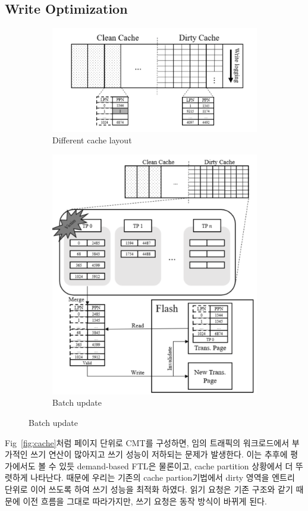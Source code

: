 \documentclass[conference]{IEEEtran}
\begin{document}
\subsection{Write Optimization}
\begin{figure}[hbt]
	\centering
	\begin{subfigure}[b]{0.5\textwidth}	
		\includegraphics[width=\linewidth]{image/PTSD/Dcache.png}
		\caption{Different cache layout} \label{fig:Dcache}
	\end{subfigure}
	\begin{subfigure}[b]{0.4\textwidth}	
		\includegraphics[width=\linewidth]{image/PTSD/batch.png}
		\caption{Batch update} \label{fig:batch}
	\end{subfigure}
\end{figure}
Fig~\ref{fig:cache}처럼 페이지 단위로 CMT를 구성하면, 임의 트래픽의 워크로드에서 부가적인 쓰기 연산이
많아지고 쓰기 성능이 저하되는 문제가 발생한다. 이는 추후에 평가에서도 볼 수 있듯 demand-based FTL은
물론이고, cache partition 상황에서 더 뚜렷하게 나타난다. 때문에 우리는 기존의 cache partion기법에서 
dirty 영역을 엔트리 단위로 이어 쓰도록 하여 쓰기 성능을 최적화 하였다. 읽기 요청은 기존 구조와 같기
때문에 이전 흐름을 그대로 따라가지만, 쓰기 요청은 동작 방식이 바뀌게 된다.
\end{document}
